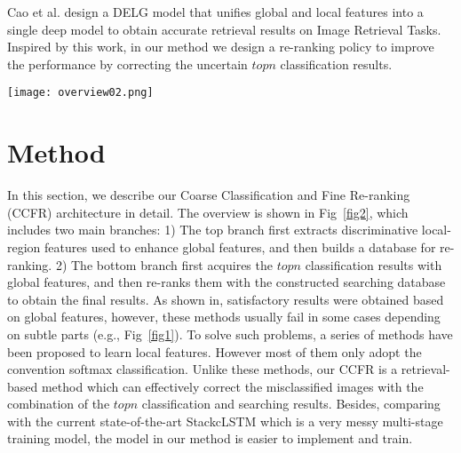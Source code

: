\documentclass[10pt,twocolumn,letterpaper]{article}
\begin{document}
Cao et al.\cite{DBLP:journals/corr/abs-2001-05027} design a DELG model that unifies global and local features into a single deep model to obtain accurate retrieval results on Image Retrieval Tasks. 
Inspired by this work, in our method we design a re-ranking policy to improve the performance by correcting the uncertain $topn$ classification results.


\begin{figure*}
\begin{center}
\texttt{[image: overview02.png]}
\end{center}
   \caption{The overview of our CCFR architecture. It mainly includes two branches: 1) On the top branch, we utilize the Triplet loss and the Scale-separated NMS to discover more discriminative local regions, and integrate these region features with the whole image features to obtain the final embedding features, which are used to build a searching database. 2) On the bottom branch, we first obtain the Coarse Classifications (the $topn$ Softmax probabilities), and then re-rank them by the statistic of the retrievals from the searching database. The Feature Extractor is pretrained by a proposed Multi-level loss and is updated by the combination of a Triplet loss and a Softmax loss during training.}
\label{fig2}
\end{figure*}
\section{Method}
In this section, we describe our Coarse Classification and Fine Re-ranking (CCFR) architecture in detail. The overview is shown in Fig~\ref{fig2}, which includes two main branches: 1) The top branch first extracts discriminative local-region features used to enhance global features, and then builds a database for re-ranking. 2) The bottom branch first acquires the $topn$ classification results with global features, and then re-ranks them with the constructed searching database to obtain the final results. As shown in\cite{li2017dynamic,cui2018large,SimonRDD20}, satisfactory results were obtained based on global features, however, these methods usually fail in some cases depending on subtle parts (e.g., Fig~\ref{fig1}). To solve such problems, a series of methods\cite{YangLWHGW18,GeLY19,korsch2019classification,du2020fine,abs-2004-02684,ZhuangW020} have been proposed to learn local features. However most of them only adopt the convention softmax classification.
Unlike these methods, our CCFR is a retrieval-based method which can effectively correct the misclassified images with the combination of the $topn$ classification and searching results.
Besides, comparing with the current state-of-the-art StackcLSTM\cite{GeLY19} which is a very messy multi-stage training model, the model in our method is easier to implement and train.
\end{document}
